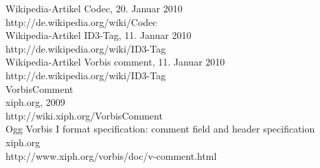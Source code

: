 \begin{thebibliography}{9999999999999}
	 Wikipedia-Artikel Codec, 20. Januar 2010\\
	http://de.wikipedia.org/wiki/Codec\\
		
	 Wikipedia-Artikel ID3-Tag, 11. Januar 2010\\
	http://de.wikipedia.org/wiki/ID3-Tag\\
	
	 Wikipedia-Artikel Vorbis comment, 11. Januar 2010\\
	http://de.wikipedia.org/wiki/ID3-Tag\\
	
	 VorbisComment\\
	xiph.org, 2009\\
	http://wiki.xiph.org/VorbisComment\\
	
	 Ogg Vorbis I format specification: comment field and header specification\\
	xiph.org\\
	http://www.xiph.org/vorbis/doc/v-comment.html\\

\end{thebibliography}